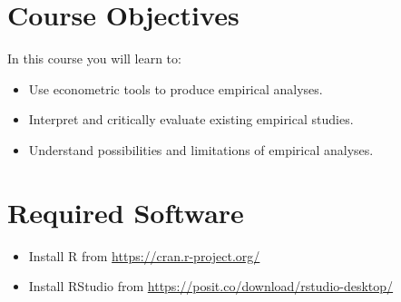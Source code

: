 \documentclass[11pt]{article}
\begin{document}
\section{Course Objectives}
In this course you will learn to:
\begin{itemize}
\item Use econometric tools to produce empirical analyses.
\item Interpret and critically evaluate existing empirical studies.
\item Understand possibilities and limitations of empirical analyses.
\end{itemize}

\section{Required Software}
\begin{itemize}
    \item Install R from \url{https://cran.r-project.org/}
    \item  Install RStudio from \url{https://posit.co/download/rstudio-desktop/}
\end{itemize}
\end{document}

